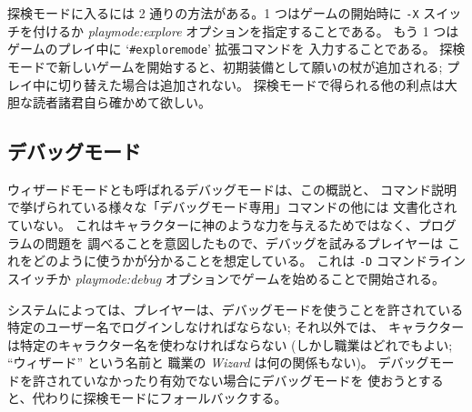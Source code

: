 探検モードに入るには 2 通りの方法がある。1 つはゲームの開始時に
{\tt -X} スイッチを付けるか
{\it playmode:explore\/}
オプションを指定することである。
もう 1 つはゲームのプレイ中に `{\tt \#exploremode}' 拡張コマンドを
入力することである。
探検モードで新しいゲームを開始すると、初期装備として願いの杖が追加される;
プレイ中に切り替えた場合は追加されない。
探検モードで得られる他の利点は大胆な読者諸君自ら確かめて欲しい。

\subsection*{デバッグモード}

ウィザードモードとも呼ばれるデバッグモードは、この概説と、
コマンド説明で挙げられている様々な「デバッグモード専用」コマンドの他には
文書化されていない。
これはキャラクターに神のような力を与えるためではなく、プログラムの問題を
調べることを意図したもので、デバッグを試みるプレイヤーは
これをどのように使うかが分かることを想定している。
これは
{\tt -D}
コマンドラインスイッチか
{\it playmode:debug\/}
オプションでゲームを始めることで開始される。

システムによっては、プレイヤーは、デバッグモードを使うことを許されている
特定のユーザー名でログインしなければならない; それ以外では、
キャラクターは特定のキャラクター名を使わなければならない
(しかし職業はどれでもよい; ``ウィザード'' という名前と
職業の {\it Wizard\/} は何の関係もない)。
デバッグモードを許されていなかったり有効でない場合にデバッグモードを
使おうとすると、代わりに探検モードにフォールバックする。

